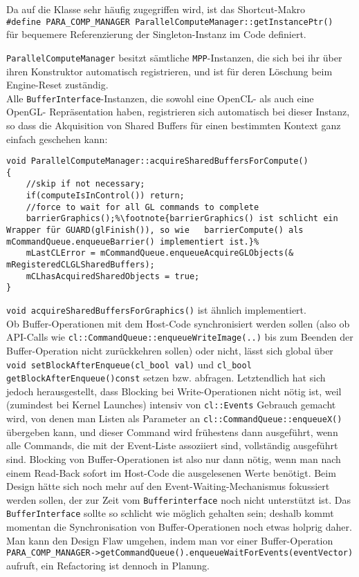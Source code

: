 	Da auf die Klasse sehr häufig zugegriffen wird, ist das Shortcut-Makro \\
	\lstinline|#define PARA_COMP_MANAGER ParallelComputeManager::getInstancePtr()|\\
	für bequemere Referenzierung der Singleton-Instanz im Code definiert.

	\lstinline|ParallelComputeManager| besitzt sämtliche \lstinline|MPP|-Instanzen, die sich bei ihr über ihren 
	Konstruktor automatisch registrieren,
	und ist für deren Löschung beim Engine-Reset zuständig.\\
	
	Alle \lstinline|BufferInterface|-Instanzen, die sowohl eine OpenCL- als auch eine OpenGL- Repräsentation
	haben, registrieren sich automatisch bei dieser Instanz, so dass die Akquisition von Shared Buffers
	für einen bestimmten Kontext ganz einfach geschehen kann:
	\begin{lstlisting}[escapechar=\%]
void ParallelComputeManager::acquireSharedBuffersForCompute()
{
	//skip if not necessary;
	if(computeIsInControl()) return;
	//force to wait for all GL commands to complete
	barrierGraphics();%\footnote{barrierGraphics() ist schlicht ein Wrapper für GUARD(glFinish()), so wie	barrierCompute() als mCommandQueue.enqueueBarrier() implementiert ist.}%
	mLastCLError = mCommandQueue.enqueueAcquireGLObjects(& mRegisteredCLGLSharedBuffers);
	mCLhasAcquiredSharedObjects = true;
}
	\end{lstlisting}
	\lstinline|void acquireSharedBuffersForGraphics()| ist ähnlich implementiert.\\
	
	Ob Buffer-Operationen mit dem Host-Code synchronisiert werden sollen 
	(also ob API-Calls wie \lstinline|cl::CommandQueue::enqueueWriteImage(..)| bis zum Beenden der Buffer-Operation
	nicht zurückkehren sollen) oder nicht, lässt sich global über \lstinline|void setBlockAfterEnqueue(cl_bool val)|
	und \lstinline|cl_bool getBlockAfterEnqueue()const| setzen bzw. abfragen.
	Letztendlich hat sich jedoch herausgestellt, dass Blocking bei Write-Operationen nicht nötig ist, weil 
	(zumindest bei Kernel Launches) intensiv von 
	\lstinline|cl::Events| Gebrauch gemacht wird, von denen man Listen als Parameter an 
	\lstinline|cl::CommandQueue::enqueueX()|
	übergeben kann, und dieser Command wird frühestens dann ausgeführt, wenn alle Commands, die mit der Event-Liste
	assoziiert sind, vollständig ausgeführt sind. Blocking von Buffer-Operationen ist also nur dann nötig, wenn man nach
	einem 	Read-Back sofort im Host-Code die ausgelesenen Werte benötigt. Beim Design hätte sich noch mehr auf den
	Event-Waiting-Mechanismus fokussiert werden sollen, der zur Zeit vom \lstinline|Bufferinterface| noch nicht unterstützt 
	ist.
	Das \lstinline|BufferInterface| sollte so schlicht wie möglich gehalten sein; deshalb kommt momentan die 
	Synchronisation von Buffer-Operationen noch etwas holprig daher. 
	Man kann den Design Flaw umgehen, indem man vor einer Buffer-Operation
	\lstinline|PARA_COMP_MANAGER->getCommandQueue().enqueueWaitForEvents(eventVector)| aufruft, ein Refactoring ist dennoch 
	in Planung.
	
